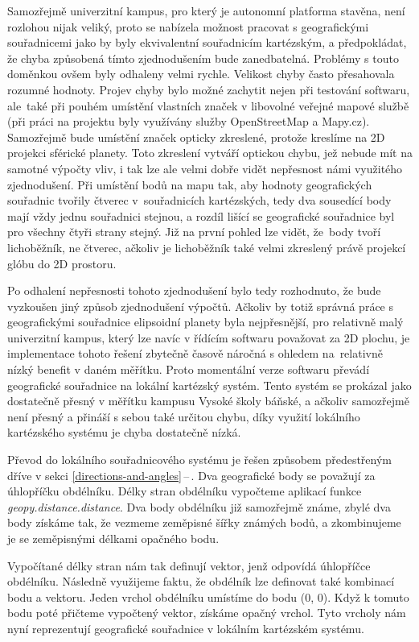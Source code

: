 \documentclass[czech, bachelor]{diploma}
\newcommand{\filipref}[1]{\ref{#1}\,--\,\nameref{#1}}
\begin{document}
Samozřejmě univerzitní kampus, pro který je autonomní platforma stavěna, není rozlohou nijak veliký, proto se nabízela možnost
pracovat s geografickými souřadnicemi jako by byly ekvivalentní souřadnicím kartézským, a předpokládat, že chyba způsobená tímto
zjednodušením bude zanedbatelná. Problémy s touto doměnkou ovšem byly odhaleny velmi rychle. Velikost chyby často přesahovala
rozumné hodnoty. Projev chyby bylo možné zachytit nejen při testování softwaru, ale~také při pouhém umístění vlastních značek
v libovolné veřejné mapové službě (při práci na projektu byly využívány služby OpenStreetMap a Mapy.cz). Samozřejmě bude umístění
značek opticky zkreslené, protože kreslíme na 2D projekci sférické planety. Toto zkreslení vytváří optickou chybu, jež nebude mít
na samotné výpočty vliv, i tak lze ale velmi dobře vidět nepřesnost námi využitého zjednodušení. Při umístění bodů na mapu tak,
aby hodnoty geografických souřadnic tvořily čtverec v~souřadnicích kartézských, tedy dva sousedící body mají vždy jednu souřadnici
stejnou, a rozdíl lišící se geografické souřadnice byl pro všechny čtyři strany stejný. Již na první pohled lze vidět, že~body
tvoří lichoběžník, ne čtverec, ačkoliv je lichoběžník také velmi zkreslený právě projekcí glóbu do 2D prostoru.

Po odhalení nepřesnosti tohoto zjednodušení bylo tedy rozhodnuto, že bude vyzkoušen jiný způsob zjednodušení výpočtů. Ačkoliv by
totiž správná práce s geografickými souřadnice elipsoidní planety byla nejpřesnější, pro relativně malý univerzitní kampus, který
lze navíc v řídícím softwaru považovat za 2D plochu, je implementace tohoto řešení zbytečně časově náročná s ohledem na~relativně
nízký benefit v daném měřítku. Proto momentální verze softwaru převádí geografické souřadnice na lokální kartézský systém. Tento
systém se prokázal jako dostatečně přesný v měřítku kampusu Vysoké školy báňské, a ačkoliv samozřejmě není přesný a přináší
s sebou také určitou chybu, díky využití lokálního kartézského systému je chyba dostatečně nízká.

Převod do lokálního souřadnicového systému je řešen způsobem předestřeným dříve v sekci \filipref{directions-and-angles}. Dva
geografické body se považují za úhlopříčku obdélníku. Délky stran obdélníku vypočteme aplikací funkce
\emph{geopy.distance.distance}. Dva body obdélníku již samozřejmě známe, zbylé dva body získáme tak, že vezmeme zeměpisné šířky
známých bodů, a zkombinujeme je se zeměpisnými délkami opačného bodu.

Vypočítané délky stran nám tak definují vektor, jenž odpovídá úhlopříčce obdélníku. Následně využijeme faktu, že obdélník lze
definovat také kombinací bodu a vektoru. Jeden vrchol obdélníku umístíme do bodu (0, 0). Když k tomuto bodu poté přičteme
vypočtený vektor, získáme opačný vrchol. Tyto vrcholy nám nyní reprezentují geografické souřadnice v lokálním kartézském systému.
\end{document}

